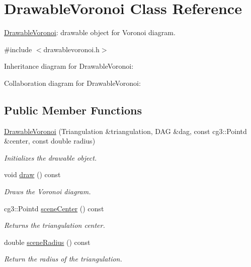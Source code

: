 \hypertarget{classDrawableVoronoi}{}\section{Drawable\+Voronoi Class Reference}
\label{classDrawableVoronoi}


\hyperlink{classDrawableVoronoi}{Drawable\+Voronoi}\+: drawable object for Voronoi diagram.  




{\ttfamily \#include $<$drawablevoronoi.\+h$>$}



Inheritance diagram for Drawable\+Voronoi\+:


Collaboration diagram for Drawable\+Voronoi\+:
\subsection*{Public Member Functions}
\begin{DoxyCompactItemize}
\item 
\hyperlink{classDrawableVoronoi_aab7fabca89392b0eb45c59b4e695855a}{Drawable\+Voronoi} (Triangulation \&triangulation, D\+AG \&dag, const cg3\+::\+Pointd \&center, const double radius)
\begin{DoxyCompactList}\small\item\em Initializes the drawable object. \end{DoxyCompactList}\item 
void \hyperlink{classDrawableVoronoi_aa10c214cfc42f752433c682760d88b70}{draw} () const
\begin{DoxyCompactList}\small\item\em Draws the Voronoi diagram. \end{DoxyCompactList}\item 
cg3\+::\+Pointd \hyperlink{classDrawableVoronoi_a1707c9e575880eeac9e981d73e03b3bf}{scene\+Center} () const
\begin{DoxyCompactList}\small\item\em Returns the triangulation center. \end{DoxyCompactList}\item 
double \hyperlink{classDrawableVoronoi_af26652a83c96748bf9a09abc6255672b}{scene\+Radius} () const
\begin{DoxyCompactList}\small\item\em Return the radius of the triangulation. \end{DoxyCompactList}\end{DoxyCompactItemize}



